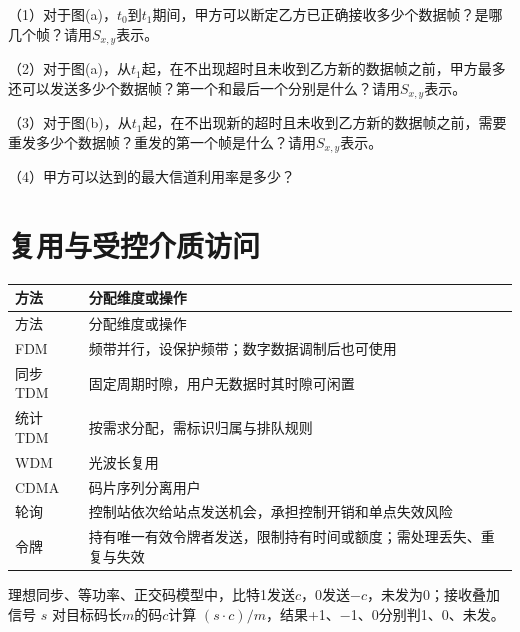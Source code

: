 （1）对于图(a)，\(t_0\)到\(t_1\)期间，甲方可以断定乙方已正确接收多少个数据帧？是哪几个帧？请用\(S_{x,y}\)表示。

（2）对于图(a)，从\(t_1\)起，在不出现超时且未收到乙方新的数据帧之前，甲方最多还可以发送多少个数据帧？第一个和最后一个分别是什么？请用\(S_{x,y}\)表示。

（3）对于图(b)，从\(t_1\)起，在不出现新的超时且未收到乙方新的数据帧之前，需要重发多少个数据帧？重发的第一个帧是什么？请用\(S_{x,y}\)表示。

（4）甲方可以达到的最大信道利用率是多少？

\section{复用与受控介质访问}\label{CN03-multiplex}

\par\smallskip
{\fontsize{9.3}{12}\selectfont\setlength{\tabcolsep}{2.5pt}\setlength{\LTleft}{0pt}\setlength{\LTright}{0pt}
\begin{longtable}{@{}>{\raggedright\arraybackslash}p{}>{\raggedright\arraybackslash}p{}@{}}
\toprule
方法 & 分配维度或操作 \\

\midrule\endfirsthead\toprule
方法 & 分配维度或操作 \\

\midrule\endhead\bottomrule\endfoot
FDM & 频带并行，设保护频带；数字数据调制后也可使用 \\

同步TDM & 固定周期时隙，用户无数据时其时隙可闲置 \\

统计TDM & 按需求分配，需标识归属与排队规则 \\

WDM & 光波长复用 \\

CDMA & 码片序列分离用户 \\

轮询 & 控制站依次给站点发送机会，承担控制开销和单点失效风险 \\

令牌 & 持有唯一有效令牌者发送，限制持有时间或额度；需处理丢失、重复与失效 \\

\end{longtable}}
\par\smallskip

理想同步、等功率、正交码模型中，比特1发送\(c\)，0发送\(-c\)，未发为0；接收叠加信号 \(s\) 对目标码长\(m\)的码\(c\)计算 \((s\cdot c)/m\)，结果+1、\ensuremath{-}1、0分别判1、0、未发。

